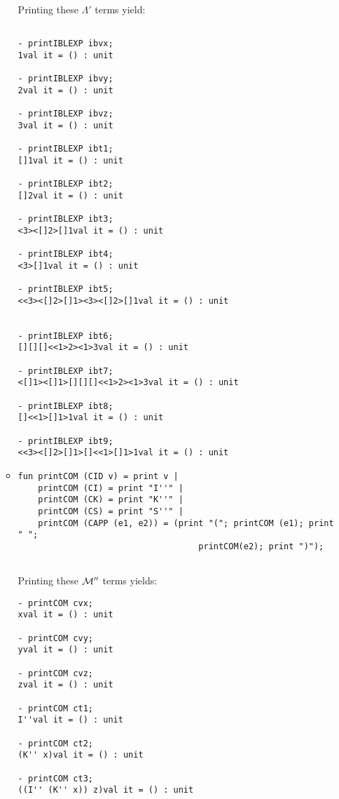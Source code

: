 \documentclass[11pt]{article}
\begin{document}
\begin{enumerate}
\begin{itemize}
\begin{verbatim}
	      	      \end{verbatim}
	      	      Printing these $\Lambda'$ terms yield:
	      	      \begin{verbatim}

- printIBLEXP ibvx;
1val it = () : unit

- printIBLEXP ibvy;
2val it = () : unit

- printIBLEXP ibvz;
3val it = () : unit

- printIBLEXP ibt1;
[]1val it = () : unit

- printIBLEXP ibt2;
[]2val it = () : unit

- printIBLEXP ibt3;
<3><[]2>[]1val it = () : unit

- printIBLEXP ibt4;
<3>[]1val it = () : unit

- printIBLEXP ibt5;
<<3><[]2>[]1><3><[]2>[]1val it = () : unit


- printIBLEXP ibt6;
[][][]<<1>2><1>3val it = () : unit

- printIBLEXP ibt7;
<[]1><[]1>[][][]<<1>2><1>3val it = () : unit

- printIBLEXP ibt8;
[]<<1>[]1>1val it = () : unit

- printIBLEXP ibt9;
<<3><[]2>[]1>[]<<1>[]1>1val it = () : unit

	      	      \end{verbatim}
	      	      
	      	\item
	      	      \begin{verbatim}
fun printCOM (CID v) = print v |
    printCOM (CI) = print "I''" |
    printCOM (CK) = print "K''" |
    printCOM (CS) = print "S''" |
    printCOM (CAPP (e1, e2)) = (print "("; printCOM (e1); print " ";
                                    printCOM(e2); print ")");


	      	      \end{verbatim}
	      	      
	      	      Printing these ${\cal M}''$ terms yields:
	      	      \begin{verbatim}
- printCOM cvx;
xval it = () : unit

- printCOM cvy;
yval it = () : unit

- printCOM cvz;
zval it = () : unit

- printCOM ct1;
I''val it = () : unit

- printCOM ct2;
(K'' x)val it = () : unit

- printCOM ct3;
((I'' (K'' x)) z)val it = () : unit


\end{verbatim}
\end{itemize}
\end{enumerate}
\end{document}
